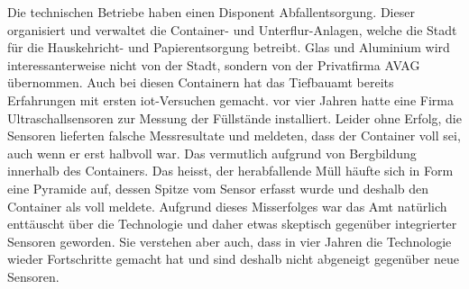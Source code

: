 Die technischen Betriebe haben einen Disponent Abfallentsorgung. Dieser organisiert und verwaltet die Container- und Unterflur-Anlagen, welche die Stadt für die Hauskehricht- und Papierentsorgung betreibt. Glas und Aluminium wird interessanterweise nicht von der Stadt, sondern von der Privatfirma AVAG übernommen.
Auch bei diesen Containern hat das Tiefbauamt bereits Erfahrungen mit ersten \gls{iot}-Versuchen gemacht. vor vier Jahren hatte eine Firma Ultraschallsensoren zur Messung der Füllstände installiert. Leider ohne Erfolg, die Sensoren lieferten falsche Messresultate und meldeten, dass der Container voll sei, auch wenn er erst halbvoll war. Das vermutlich aufgrund von \glqq{}Bergbildung\grqq{} innerhalb des Containers. Das heisst, der herabfallende Müll häufte sich in Form eine Pyramide auf, dessen Spitze vom Sensor erfasst wurde und deshalb den Container als voll meldete. Aufgrund dieses Misserfolges war das Amt natürlich enttäuscht über die Technologie und daher etwas skeptisch gegenüber integrierter Sensoren geworden. Sie verstehen aber auch, dass in vier Jahren die Technologie wieder Fortschritte gemacht hat und sind deshalb nicht abgeneigt gegenüber neue Sensoren.

